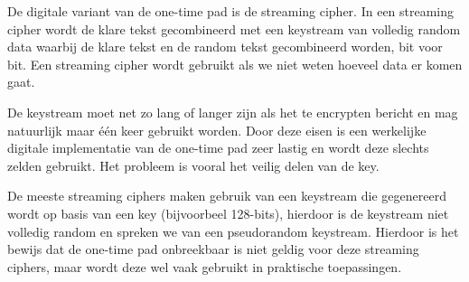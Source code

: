De digitale variant van de one-time pad is de streaming cipher. In een streaming cipher wordt de klare tekst gecombineerd met een keystream van volledig random data waarbij de klare tekst en de random tekst gecombineerd worden, bit voor bit. Een streaming cipher wordt gebruikt als we niet weten hoeveel data er komen gaat.

De keystream moet net zo lang of langer zijn als het te encrypten bericht en mag natuurlijk maar \'e\'en keer gebruikt worden. Door deze eisen is een werkelijke digitale implementatie van de one-time pad zeer lastig en wordt deze slechts zelden gebruikt. Het probleem is vooral het veilig delen van de key.

De meeste streaming ciphers maken gebruik van een keystream die gegenereerd wordt op basis van een key (bijvoorbeel 128-bits), hierdoor is de keystream niet volledig random en spreken we van een pseudorandom keystream. Hierdoor is het bewijs dat de one-time pad onbreekbaar is niet geldig voor deze streaming ciphers, maar wordt deze wel vaak gebruikt in praktische toepassingen.

